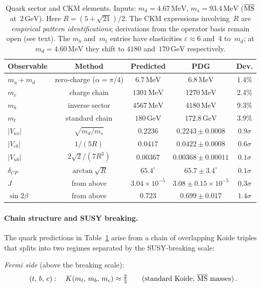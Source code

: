 \documentclass[12pt,a4paper]{article}
\newcommand{\MeV}{\,\mathrm{MeV}}
\newcommand{\GeV}{\,\mathrm{GeV}}
\begin{document}
\begin{table}[ht]
\centering
\begin{tabular}{lcccc}
\toprule
  Observable & Method & Predicted & PDG & Dev. \\
\midrule
$m_u + m_d$ & zero-charge ($\alpha{=}\pi/4$) & $6.7\MeV$ & $6.8\MeV$ & $1.4\%$ \\
$m_c$ & charge chain & $1301\MeV$ & $1270\MeV$ & $2.4\%$ \\
$m_b$ & inverse sector & $4567\MeV$ & $4180\MeV$ & $9.3\%$ \\
$m_t$ & standard chain & $180\GeV$ & $172.8\GeV$ & $3.9\%$ \\
$|V_{us}|$ & $\sqrt{m_d/m_s}$ & $0.2236$ & $0.2243 \pm 0.0008$ & $0.9\sigma$ \\
$|V_{cb}|$ & $1/(5R)$ & $0.0417$ & $0.0422 \pm 0.0008$ & $0.6\sigma$ \\
$|V_{ub}|$ & $2\sqrt{2}/(7R^3)$ & $0.00367$ & $0.00368 \pm 0.00011$ & $0.1\sigma$ \\
$\delta_{CP}$ & $\arctan\sqrt{R}$ & $65.4^\circ$ & $65.7 \pm 3.4^\circ$ & $0.1\sigma$ \\
$J$ & from above & $3.04{\times}10^{-5}$ & $3.08 \pm 0.15{\times}10^{-5}$ & $0.3\sigma$ \\
$\sin 2\beta$ & from above & $0.723$ & $0.699 \pm 0.017$ & $1.4\sigma$ \\
\bottomrule
\end{tabular}
\caption{Quark sector and CKM elements.
Inputs: $m_d = 4.67\MeV$, $m_s = 93.4\MeV$
($\overline{\rm MS}$ at~$2\GeV$). Here $R = (5+\sqrt{21})/2$.
The CKM expressions involving~$R$ are \emph{empirical pattern
identifications}; derivations from the operator basis remain open
(see text). The $m_b$ and~$m_t$ entries have elasticities
$\varepsilon \approx 6$ and~4 to~$m_d$; at $m_d = 4.60\MeV$ they
shift to $4180$ and~$170\GeV$ respectively.}
\label{tab:quarks}
\end{table}

\paragraph{Chain structure and SUSY breaking.}
The quark predictions in Table~\ref{tab:quarks} arise from a chain of
overlapping Koide triples~\cite{Rivero:2024epjc} that splits into two
regimes separated by the SUSY-breaking scale:

\noindent
\emph{Fermi side} (above the breaking scale):
\begin{equation}
  (t,\,b,\,c):\quad K(m_t,\,m_b,\,m_c) \approx \tfrac{2}{3}
  \qquad\text{(standard Koide, $\overline{\rm MS}$ masses)}\,.
  \label{eq:chain_tbc}
\end{equation}
\end{document}
